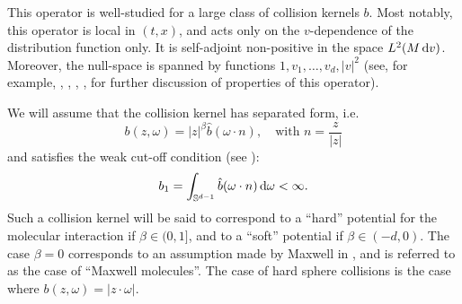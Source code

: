 This operator is well-studied for a large class of collision kernels $b$. Most notably, this operator is local in $(t,x)$, and acts only on the $v$-dependence of the distribution function only. It is self-adjoint non-positive in the space $L^2(M{\,\mathrm{d} v})$. Moreover, the null-space is spanned by functions $1,v_1,\ldots,v_d,|v|^2$ (see, for example, \cite{Caflisch1980Boltzmann}, \cite{Glassey1987Cauchy}, \cite{Golse1989Stationary}, \cite{Grad:mist}, \cite{Levermore2010Compactness} for further discussion of properties of this operator).

We will assume that the collision kernel has separated form, i.e.
\[ b(z, \omega) = |z|^\beta \hat b \left(\omega \cdot n \right),\quad \mbox{with }n=\frac{z}{|z|}\]
and satisfies the weak cut-off condition (see \cite{Grad:weakCO}):
 \begin{equation}\label{eq:b1}
 	b_1 = \int_{{\mathbb S^{d-1}}} \hat b(\omega\cdot n){\,\mathrm{d} \omega}< \infty.
 \end{equation}
Such a collision kernel will be said to correspond to a \enquote{hard} potential for the molecular
interaction if $\beta \in  (0, 1]$, and to a  \enquote{soft}
potential if 
$\beta\in(-d,0)$.
The case $\beta=0$ corresponds to an assumption made by Maxwell 
in \cite{maxwell1867dynamical}, and is referred to as the case of  \enquote{Maxwell molecules}.
The case of hard sphere collisions is the case where $b(z, \omega) = |z \cdot \omega|$. %

